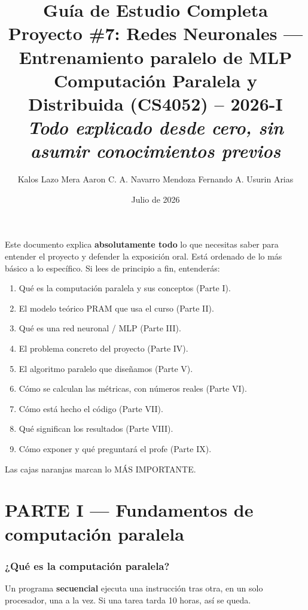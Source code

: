 \documentclass[11pt,a4paper]{article}
\title{\Huge\textbf{Guía de Estudio Completa}\\[6pt]
\Large Proyecto \#7: Redes Neuronales --- Entrenamiento paralelo de MLP\\[4pt]
\large Computación Paralela y Distribuida (CS4052) -- 2026-I\\[2pt]
\small \emph{Todo explicado desde cero, sin asumir conocimientos previos}}
\author{Kalos Lazo Mera \quad Aaron C. A. Navarro Mendoza \quad Fernando A. Usurin Arias}
\date{Julio de 2026}
\newcommand{\term}[1]{\textbf{\textcolor{clave}{#1}}}
\begin{document}
\maketitle
\tableofcontents
\newpage

\begin{caja}[title=\textbf{Cómo usar esta guía}]
Este documento explica \textbf{absolutamente todo} lo que necesitas saber para
entender el proyecto y defender la exposición oral. Está ordenado de lo más
básico a lo específico. Si lees de principio a fin, entenderás:
\begin{enumerate}
  \item Qué es la computación paralela y sus conceptos (Parte I).
  \item El modelo teórico PRAM que usa el curso (Parte II).
  \item Qué es una red neuronal / MLP (Parte III).
  \item El problema concreto del proyecto (Parte IV).
  \item El algoritmo paralelo que diseñamos (Parte V).
  \item Cómo se calculan las métricas, con números reales (Parte VI).
  \item Cómo está hecho el código (Parte VII).
  \item Qué significan los resultados (Parte VIII).
  \item Cómo exponer y qué preguntará el profe (Parte IX).
\end{enumerate}
Las cajas \textcolor{orange!70!black}{naranjas} marcan lo MÁS IMPORTANTE.
\end{caja}

\part*{PARTE I --- Fundamentos de computación paralela}

\section{¿Qué es la computación paralela?}

Un programa \term{secuencial} ejecuta una instrucción tras otra, en un solo
procesador, una a la vez. Si una tarea tarda 10 horas, así se queda.
\end{document}
